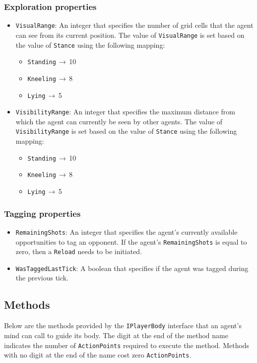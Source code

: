\documentclass[a4paper,english,DIV=16,11pt,parskip=half,dvipsnames,listof=totoc,index=totoc,bibliography=totoc]{scrartcl}
\begin{document}
\subsubsection{Exploration properties} \label{sssec:explAttr}
\begin{itemize}
  \item \texttt{VisualRange}: An integer that specifies the number of grid cells that the agent can see from its current position. The value of \texttt{VisualRange} is set based on the value of \texttt{Stance} using the following mapping:
  \begin{itemize}
    \item \texttt{Standing}$\,\to\,$10
    \item \texttt{Kneeling}$\,\to\,$8
    \item \texttt{Lying}$\,\to\,$5
  \end{itemize}
  \item \texttt{VisibilityRange}: An integer that specifies the maximum distance from which the agent can currently be seen by other agents. The value of \texttt{VisibilityRange} is set based on the value of \texttt{Stance} using the following mapping:
  \begin{itemize}
    \item \texttt{Standing}$\,\to\,$10
    \item \texttt{Kneeling}$\,\to\,$8
    \item \texttt{Lying}$\,\to\,$5
  \end{itemize}
\end{itemize}
%
\subsubsection{Tagging properties} \label{sssec:tagAttr}
\begin{itemize}
  \item \texttt{RemainingShots}: An integer that specifies the agent's currently available opportunities to tag an opponent. If the agent's \texttt{RemainingShots} is equal to zero, then a \texttt{Reload} needs to be initiated.
  \item \texttt{WasTaggedLastTick}: A boolean that specifies if the agent was tagged during the previous tick.
\end{itemize}
%
\subsection{Methods} \label{ssec:methods}
Below are the methods provided by the \texttt{IPlayerBody} interface that an agent's mind can call to guide its body. The digit at the end of the method name indicates the number of \texttt{ActionPoints} required to execute the method. Methods with no digit at the end of the name cost zero \texttt{ActionPoints}.
\end{document}
